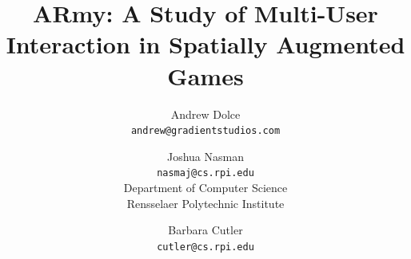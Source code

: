 \documentclass[10pt,twocolumn,letterpaper]{article}
\begin{document}
\title{ARmy: A Study of Multi-User Interaction in Spatially Augmented Games}

\author{Andrew Dolce\\
{\tt\small andrew@gradientstudios.com}
\and
Joshua Nasman\\
{\tt\small nasmaj@cs.rpi.edu}\\
{\normalsize Department of Computer Science \vspace{-0.01in}}\\
{\normalsize Rensselaer Polytechnic Institute} 
\and
Barbara Cutler\\
{\tt\small cutler@cs.rpi.edu}
}

\maketitle
\end{document}
